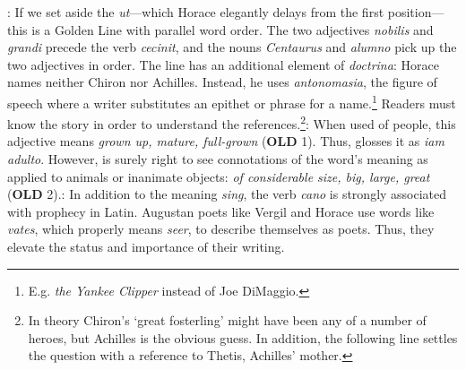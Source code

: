 
: If we set aside the \textit{ut}---which Horace elegantly delays from the first position---this is a Golden Line with parallel word order.  The two adjectives \textit{nobilis} and \textit{grandi} precede the verb \textit{cecinit}, and the nouns \textit{Centaurus} and \textit{alumno} pick up the two adjectives in order.  The line has an additional element of \textit{doctrina}: Horace names neither Chiron nor Achilles.  Instead, he uses \textit{antonomasia}, the figure of speech where a writer substitutes an epithet or phrase for a name.\footnote{E.g. \textit{the Yankee Clipper} instead of Joe DiMaggio.} Readers must know the story in order to understand the references.\footnote{In theory Chiron's `great fosterling' might have been any of a number of heroes, but Achilles is the obvious guess.  In addition, the following line settles the question with a reference to Thetis, Achilles' mother.}\indent{}: When used of people, this adjective means \textit{grown up, mature, full-grown} (\textbf{OLD} 1).  Thus, \citet{watson2003} glosses it as \textit{iam adulto}.  However, \citet{mankin1995} is surely right to see connotations of the word's meaning as applied to animals or inanimate objects: \textit{of considerable size, big, large, great} (\textbf{OLD} 2).\indent{}: In addition to the meaning \textit{sing}, the verb \textit{cano} is strongly associated with prophecy in Latin.  Augustan poets like Vergil and Horace use words like \textit{vates}, which properly means \textit{seer}, to describe themselves as poets.  Thus, they elevate the status and importance of their writing.


